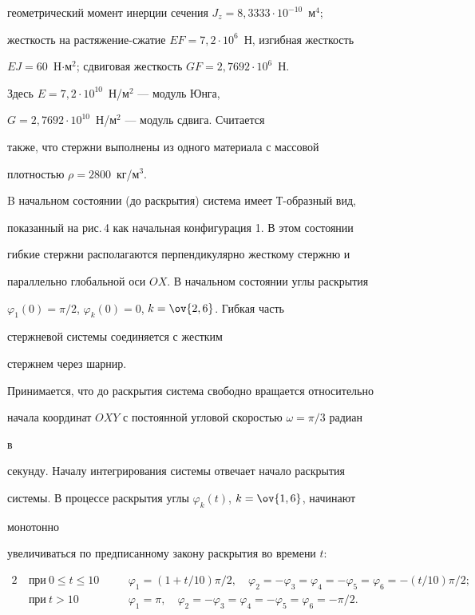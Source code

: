 геометрический момент инерции сечения $J_z=8{,}3333\cdot 10^{-10}$~м${}^4$; 


жесткость на растяжение-сжатие $EF=7{,}2\cdot 10^6$~Н, изгибная жесткость 


$EJ=60$~H$\cdot$м${}^2$; сдвиговая жесткость $GF=2{,}7692\cdot 10^6$~Н. 


Здесь $E=7{,}2\cdot 10^{10}$~Н/м${}^2$ --- модуль Юнга, 


$G=2{,}7692\cdot 10^{10}$~Н/м${}^2$ --- модуль сдвига. Считается 


также, что стержни выполнены из одного материала с массовой 


плотностью $\rho=2800$~кг/м$^3$. 


 


B начальном состоянии (до раскрытия) система имеет Т-образный вид, 


показанный на рис.\,4 как начальная конфигурация 1. В этом состоянии 


гибкие стержни располагаются перпендикулярно жесткому стержню и 


параллельно глобальной оси $OX$. В начальном состоянии углы раскрытия 


$\varphi_1(0)=\pi/2$, $\varphi_k(0)=0$, $k=\ov{2,6}$. Гибкая часть 


стержневой системы соединяется с жестким 


стержнем через шарнир. 


 


Принимается, что до раскрытия система свободно вращается относительно 


начала координат $OXY$ с постоянной угловой скоростью $\omega=\pi/3$ радиан 


в 


секунду. Началу интегрирования системы отвечает начало раскрытия 


системы. В процессе раскрытия углы $\varphi_k(t)$, $k=\ov{1,6}$, начинают 


монотонно 


увеличиваться по предписанному закону раскрытия во времени $t$: 


\begin{alignat*}{2} 


&\ \text{при} \ 0\le t\le 10 &\quad & \varphi_1=(1+t/10)\pi/2, 


\quad \varphi_2=-\varphi_3=\varphi_4=-\varphi_5= \varphi_6=-(t/10)\pi/2;\\ 


&\ \text{при}\ t>10 & \quad & \varphi_1=\pi,\quad 


\varphi_2=-\varphi_3=\varphi_4=-\varphi_5=\varphi_6=-\pi/2. 


\end{alignat*} 


